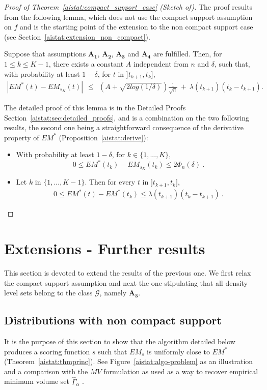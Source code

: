 \begin{proof}[Proof of Theorem~\ref{aistat:compact_support_case} (Sketch of)]
The proof results from the following lemma, which does not use the compact support assumption on $f$ and is the starting point of the extension to the non compact support case (see Section~\ref{aistat:extension_non_compact}).
\begin{lemma} 
\label{aistat:theofini} Suppose that assumptions $\mathbf{A_1}$, $\mathbf{A_2}$, $\mathbf{A_3}$ and
  $\mathbf{A_4}$ are fulfilled. Then, for $1 \le k \le K-1$, there exists a constant $A$ independent from $n$ and  $\delta$, such that, with probability at least $1-\delta$, for $t$ in $]t_{k+1},t_{k}]$, 
\begin{align*}
|EM^*(t)-EM_{s_K}(t)| ~~\le~~\left(A+\sqrt{2log(1/\delta)}\right)\frac{1}{\sqrt n} ~+~ \lambda(t_{k+1})(t_{k}-t_{k+1}).
\end{align*}
\end{lemma}
The detailed proof of this lemma is in the Detailed Proofs Section~\ref{aistat:sec:detailed_proofs}, and is a combination on the two following results, the second one being a straightforward consequence of the derivative property of $EM^*$ (Proposition~\ref{aistat:derive}):
\begin{itemize}
\item With probability at least $1-\delta$, for $k \in \{1,...,K\}$, $$0 \le EM^*(t_{k})-EM_{s_K}(t_k) \le 2 \Phi_n(\delta)~.$$ 
\item Let $k$ in $\{1,...,K-1\}$. Then for every $t$ in $]t_{k+1},t_{k}]$,
\begin{align*}
0 \le EM^*(t)-EM^*(t_{k}) \le \lambda(t_{k+1}) (t_{k}-t_{k+1})~.
\end{align*}
\end{itemize}
\end{proof}









\section{Extensions - Further results}\label{aistat:sec:ext}
This section is devoted to extend the results of the previous one. We first relax the compact support assumption and next the one stipulating that all density level sets belong to the class $\mathcal{G}$, namely $\mathbf{A_3}$.

\subsection{Distributions with non compact support}\label{aistat:sec:infiniteSupport}
\label{aistat:extension_non_compact}
It is the purpose of this section to show that the algorithm detailed below produces a scoring function $s$ such that  $EM_s$ is uniformly close to $EM^*$ (Theorem~\ref{aistat:thmprinc}). 
 See Figure~\ref{aistat:algo-problem} as an illustration and a comparison with the $MV$ formulation as used as a way to recover empirical minimum volume set $\hat \Gamma_\alpha$ .

